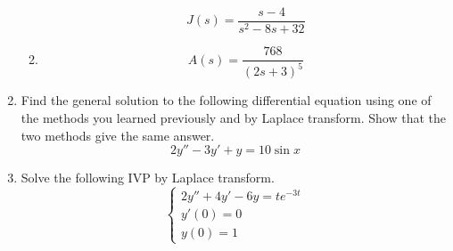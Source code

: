 \begin{enumerate}[label=\arabic*.]
\begin{enumerate}[label=(\alph*)]
\begin{equation*}
					J(s) = \frac{s-4}{s^2 -8s + 32}
				\end{equation*}
			\item
				\begin{equation*}
					A(s) = \frac{768}{(2s+3)^5}
				\end{equation*}
		\end{enumerate}
	\item
		Find the general solution to the following differential equation using one of the methods you learned previously and by Laplace transform. Show that the two methods give the same answer.
		\begin{equation*}
			2y'' - 3y' + y = 10\sin{x}
		\end{equation*}
	\item
		Solve the following IVP by Laplace transform.
		\begin{equation*}
			\begin{cases}
				2y'' + 4y' - 6y = te^{-3t} \\
				y'(0) = 0 \\
				y(0) = 1
			\end{cases}
		\end{equation*}
\end{enumerate}